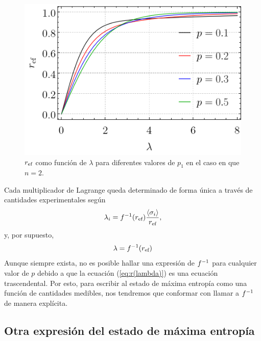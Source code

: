 \begin{figure}[ht]
    \centering
    \includegraphics[width=0.5\linewidth]{chapter2/figures/r(lambda).png}
    \caption{$r_{\text{ef}}$ como función de $\lambda$ para diferentes valores de $p_{1}$ en el caso en que $n=2$.}
    \label{fig:r(lambda)}
\end{figure}
Cada multiplicador de Lagrange queda determinado de forma única a través de cantidades experimentales según 
\begin{equation}
    \lambda_{i}=f^{-1}(r_{\text{ef}}) \frac{\expval{\sigma_{i}}}{r_{\text{ef}}},
\end{equation}
y, por supuesto,
\begin{equation}
    \lambda=f^{-1}(r_{\text{ef}})\nonumber
\end{equation}
Aunque siempre exista, no es posible hallar una expresión de $f^{-1}$ para cualquier valor de $p$ debido a que la ecuación (\ref{eq:r(lambda)}) es una ecuación trascendental. Por esto, para escribir al estado de máxima entropía como una función de cantidades medibles, nos tendremos que conformar con llamar a $f^{-1}$ de manera explícita.

\subsection{Otra expresión del estado de máxima entropía}


